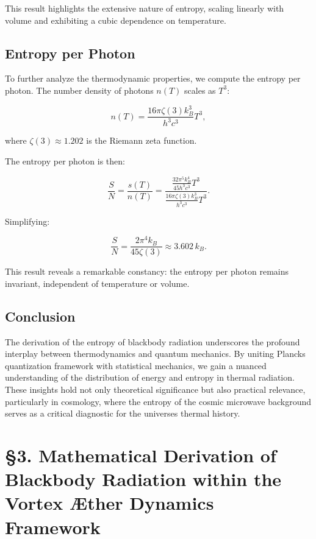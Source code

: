  This result highlights the extensive nature of entropy, scaling linearly with volume and exhibiting a cubic dependence on temperature.

 \subsection*{Entropy per Photon}
 To further analyze the thermodynamic properties, we compute the entropy per photon. The number density of photons $n(T)$ scales as $T^3$:

 \begin{equation*}
  n(T) = \frac{16 \pi \zeta(3) k_B^3}{h^3 c^3} T^3,
 \end{equation*}

 where $\zeta(3) \approx 1.202$ is the Riemann zeta function.

 The entropy per photon is then:

 \begin{equation*}
  \frac{S}{N} = \frac{s(T)}{n(T)} = \frac{\frac{32 \pi^5 k_B^4}{45 h^3 c^3} T^3}{\frac{16 \pi \zeta(3) k_B^3}{h^3 c^3} T^3}.
 \end{equation*}

 Simplifying:

 \begin{equation*}
  \frac{S}{N} = \frac{2 \pi^4 k_B}{45 \zeta(3)} \approx 3.602 \, k_B.
 \end{equation*}

 This result reveals a remarkable constancy: the entropy per photon remains invariant, independent of temperature or volume.

 \subsection*{Conclusion}
 The derivation of the entropy of blackbody radiation underscores the profound interplay between thermodynamics and quantum mechanics. By uniting Planck\rqs s quantization framework with statistical mechanics, we gain a nuanced understanding of the distribution of energy and entropy in thermal radiation. These insights hold not only theoretical significance but also practical relevance, particularly in cosmology, where the entropy of the cosmic microwave background serves as a critical diagnostic for the universe\rqs s thermal history.



  \section*{§3. Mathematical Derivation of Blackbody Radiation within the Vortex Æther Dynamics Framework}


